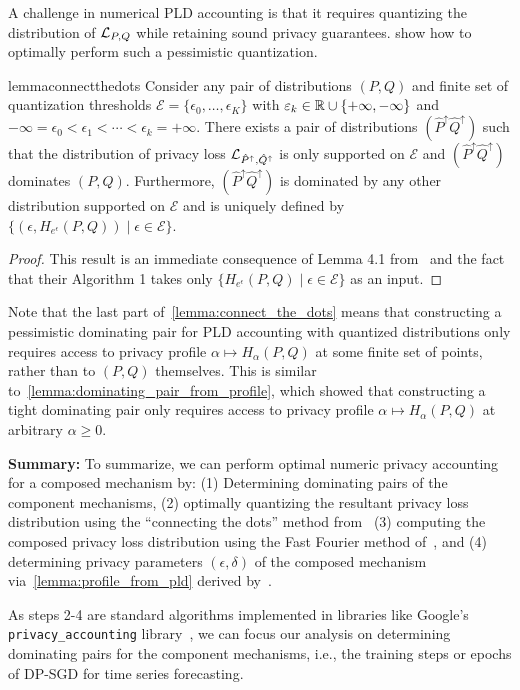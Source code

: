 A challenge in numerical PLD accounting is that it requires quantizing the distribution of $\mathcal{L}_{P,Q}$ while retaining sound privacy guarantees.
\citet{doroshenko2022connect} show how to optimally perform such a pessimistic quantization.
\begin{restatable}{lemma}{connectthedots}\label{lemma:connect_the_dots}
    Consider any pair of distributions $(P,Q)$ and finite set of quantization thresholds $\mathcal{E} = \{\epsilon_0,\dots,\epsilon_K\}$ with $\varepsilon_k \in {\mathbb{R}} \cup \{+\infty, -\infty\}$ and $-\infty = \epsilon_0 < \epsilon_1 < \cdots < \epsilon_k = + \infty$.
    There exists a pair of distributions $(\hat{P}^\uparrow\hat{Q}^\uparrow)$
    such that the distribution of privacy loss $\mathcal{L}_{\hat{P}^\uparrow,\hat{Q}^\uparrow}$
    is only supported on $\mathcal{E}$ and $(\hat{P}^\uparrow\hat{Q}^\uparrow)$ dominates $(P,Q)$.
    Furthermore, $(\hat{P}^\uparrow\hat{Q}^\uparrow)$ is dominated by any other distribution supported on $\mathcal{E}$ 
    and is uniquely defined by $\{(\epsilon, H_{e^\epsilon}(P,Q)) \mid \epsilon \in \mathcal{E}\}$.
\end{restatable}
\begin{proof}
    This result is an immediate consequence of Lemma 4.1 from~\cite{doroshenko2022connect} and the fact that their Algorithm 1 takes only $\{H_{e^\epsilon}(P,Q) \mid \epsilon \in \mathcal{E}\}$ as an input.
\end{proof}
Note that the last part of~\cref{lemma:connect_the_dots} means that constructing a pessimistic dominating pair for PLD accounting with quantized distributions only requires access to privacy profile $\alpha \mapsto H_\alpha(P,Q)$ at some finite set of points, rather than to $(P,Q)$ themselves.
This is similar to~\cref{lemma:dominating_pair_from_profile}, which showed that constructing a tight dominating pair only requires access to privacy profile $\alpha \mapsto H_\alpha(P,Q)$ at arbitrary $\alpha \geq 0$.

\textbf{Summary:}
To summarize, we can perform optimal numeric privacy accounting for a composed mechanism by:
(1) Determining dominating pairs of the component mechanisms,
(2) optimally quantizing the resultant privacy loss distribution using the ``connecting the dots'' method from~\cite{doroshenko2022connect}
(3) computing the composed privacy loss distribution using the Fast Fourier method of~\cite{koskela2020computing},
and (4) determining privacy parameters $(\epsilon,\delta)$ of the composed mechanism via~\cref{lemma:profile_from_pld} derived by~\citet{balle2018privacy}.

As steps 2-4 are standard algorithms implemented in libraries like Google's \texttt{privacy\_accounting} library~\cite{dpaccountinglibrary},
we can focus our analysis on determining dominating pairs for the component mechanisms, i.e., the training steps or epochs of DP-SGD for time series forecasting.